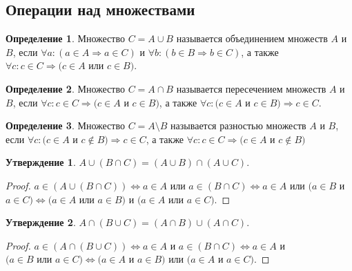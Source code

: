 \documentclass[a4paper, 12pt]{article}
\newcommand{\lra}{\Leftrightarrow}
\theoremstyle{definition}
\newtheorem*{definition}{Определение}
\newtheorem*{statement}{Утверждение}
\begin{document}
    \subsection{Операции над множествами}
        \begin{definition}
            Множество $C=A\cup B$ называется объединением множеств $A$ и $B$, если $\forall a: (a\in A \Rightarrow a\in C)$ и $\forall b: (b\in B\Rightarrow b\in C)$, а также $\forall c: c\in C \Rightarrow (c\in A$ или $c\in B)$.        \end{definition}
        \begin{definition}
            Множество $C=A\cap B$ называется пересечением множеств $A$ и $B$, если $\forall c: c\in C \Rightarrow (c\in A$ и $c\in B)$, а также $\forall c: (c\in A$ и $c\in B) \Rightarrow c\in C$.        \end{definition}
        \begin{definition}
            Множество $C=A\setminus B$ называется разностью множеств $A$ и $B$, если $\forall c: (c\in A$ и $c\not\in B) \Rightarrow c\in C$, а также $\forall c: c\in C \Rightarrow (c\in A$ и $c\not\in B)$
        \end{definition}
        \begin{statement}
            $A\cup(B\cap C)=(A\cup B)\cap(A\cup C)$.
        \end{statement}
        \begin{proof} 
            $a\in (A\cup(B\cap C)) \lra a\in A$ или $a\in (B\cap C) \lra a\in A$ или $(a\in B$ и $a\in C) \lra (a\in A$ или $a\in B)$ и $(a\in A$ или $a\in C)$.
        \end{proof}
        \begin{statement}
            $A\cap(B\cup C)=(A\cap B)\cup(A\cap C)$.
        \end{statement}
        \begin{proof}
            $a\in (A\cap(B\cup C)) \lra a\in A$ и $a\in (B\cap C)\lra a\in A$ и \\ $(a\in B$ или $a\in C)\lra (a\in A$ и $a\in B)$ или $(a\in A$ и $a\in C)$.
        \end{proof}
\end{document}
